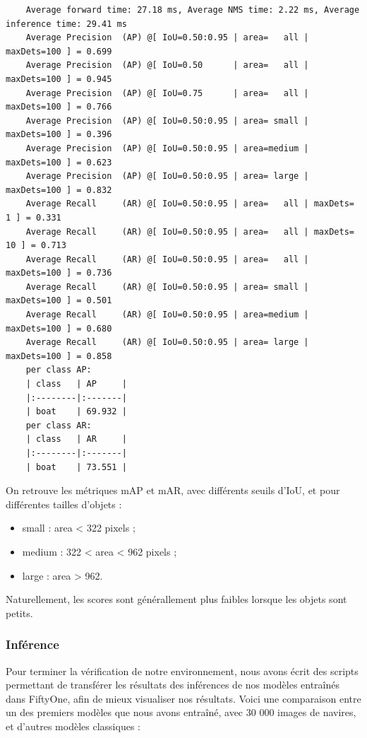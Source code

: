 \begin{verbatim}
    Average forward time: 27.18 ms, Average NMS time: 2.22 ms, Average inference time: 29.41 ms
    Average Precision  (AP) @[ IoU=0.50:0.95 | area=   all | maxDets=100 ] = 0.699
    Average Precision  (AP) @[ IoU=0.50      | area=   all | maxDets=100 ] = 0.945
    Average Precision  (AP) @[ IoU=0.75      | area=   all | maxDets=100 ] = 0.766
    Average Precision  (AP) @[ IoU=0.50:0.95 | area= small | maxDets=100 ] = 0.396
    Average Precision  (AP) @[ IoU=0.50:0.95 | area=medium | maxDets=100 ] = 0.623
    Average Precision  (AP) @[ IoU=0.50:0.95 | area= large | maxDets=100 ] = 0.832
    Average Recall     (AR) @[ IoU=0.50:0.95 | area=   all | maxDets=  1 ] = 0.331
    Average Recall     (AR) @[ IoU=0.50:0.95 | area=   all | maxDets= 10 ] = 0.713
    Average Recall     (AR) @[ IoU=0.50:0.95 | area=   all | maxDets=100 ] = 0.736
    Average Recall     (AR) @[ IoU=0.50:0.95 | area= small | maxDets=100 ] = 0.501
    Average Recall     (AR) @[ IoU=0.50:0.95 | area=medium | maxDets=100 ] = 0.680
    Average Recall     (AR) @[ IoU=0.50:0.95 | area= large | maxDets=100 ] = 0.858
    per class AP:
    | class   | AP     |
    |:--------|:-------|
    | boat    | 69.932 |
    per class AR:
    | class   | AR     |
    |:--------|:-------|
    | boat    | 73.551 |

\end{verbatim}

On retrouve les métriques mAP et mAR, avec différents seuils d'IoU, et pour différentes tailles d'objets :

\begin{itemize}
    \item small : area < 322 pixels ;
    \item medium : 322 < area < 962 pixels ;
    \item large : area > 962.
\end{itemize}

Naturellement, les scores sont générallement plus faibles lorsque les objets sont petits.

\subsubsection{Inférence}

Pour terminer la vérification de notre environnement, nous avons écrit des scripts permettant de
transférer les résultats des inférences de nos modèles entraînés dans FiftyOne, afin de mieux visualiser
nos résultats. Voici une comparaison entre un des premiers modèles que nous avons entraîné, avec 30 000 images
de navires, et d'autres modèles classiques :

